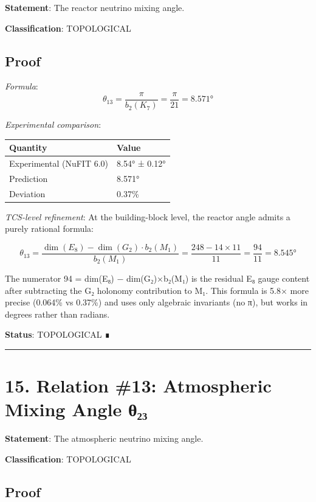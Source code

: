 \documentclass[11pt,a4paper]{article}
\begin{document}
\textbf{Statement}: The reactor neutrino mixing angle.

\textbf{Classification}: TOPOLOGICAL

\subsection{Proof}\label{proof-16}

\emph{Formula}: \[\theta_{13} = \frac{\pi}{b_2(K_7)} = \frac{\pi}{21} = 8.571°\]

\emph{Experimental comparison}:

\begin{longtable}[]{@{}ll@{}}
\toprule\noalign{}
Quantity & Value \\
\midrule\noalign{}
\endhead
\bottomrule\noalign{}
\endlastfoot
Experimental (NuFIT 6.0) & 8.54° ± 0.12° \\
Prediction & 8.571° \\
Deviation & 0.37\% \\
\end{longtable}

\emph{TCS-level refinement}: At the building-block level, the reactor angle admits a purely rational formula:

\[\theta_{13} = \frac{\dim(E_8) - \dim(G_2) \cdot b_2(M_1)}{b_2(M_1)} = \frac{248 - 14 \times 11}{11} = \frac{94}{11} = 8.545°\]

The numerator 94 = dim(E₈) − dim(G₂)×b₂(M₁) is the residual E₈ gauge content after subtracting the G₂ holonomy contribution to M₁. This formula is 5.8× more precise (0.064\% vs 0.37\%) and uses only algebraic invariants (no π), but works in degrees rather than radians.

\textbf{Status}: TOPOLOGICAL ∎

\begin{center}\rule{\linewidth}{0.5pt}\end{center}

\section{15. Relation \#13: Atmospheric Mixing Angle θ₂₃}\label{relation-13-atmospheric-mixing-angle-ux3b8ux2082ux2083}

\textbf{Statement}: The atmospheric neutrino mixing angle.

\textbf{Classification}: TOPOLOGICAL

\subsection{Proof}\label{proof-17}
\end{document}
